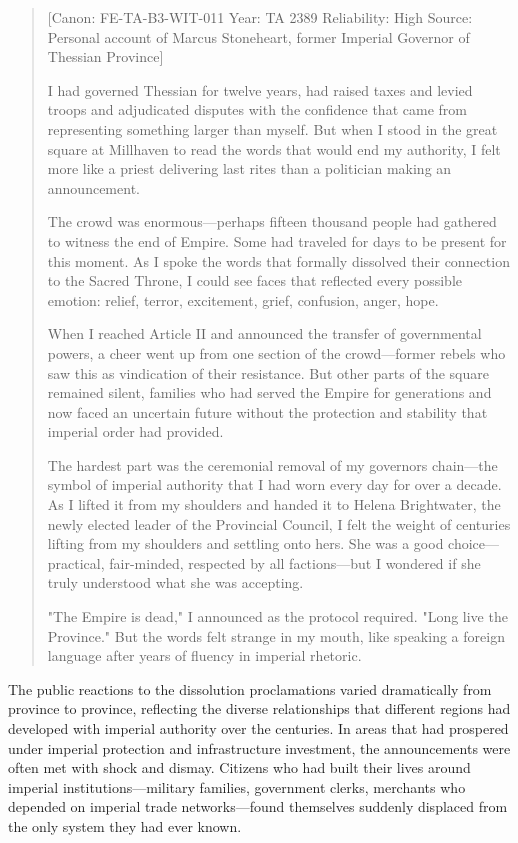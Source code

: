 \begin{quote}
{[}Canon: FE-TA-B3-WIT-011 \textbar{} Year: TA 2389 \textbar{}
Reliability: High \textbar{} Source: Personal account of Marcus
Stoneheart, former Imperial Governor of Thessian Province{]}

I had governed Thessian for twelve years, had raised taxes and levied
troops and adjudicated disputes with the confidence that came from
representing something larger than myself. But when I stood in the great
square at Millhaven to read the words that would end my authority, I
felt more like a priest delivering last rites than a politician making
an announcement.

The crowd was enormous---perhaps fifteen thousand people had gathered to
witness the end of Empire. Some had traveled for days to be present for
this moment. As I spoke the words that formally dissolved their
connection to the Sacred Throne, I could see faces that reflected every
possible emotion: relief, terror, excitement, grief, confusion, anger,
hope.

When I reached Article II and announced the transfer of governmental
powers, a cheer went up from one section of the crowd---former rebels
who saw this as vindication of their resistance. But other parts of the
square remained silent, families who had served the Empire for
generations and now faced an uncertain future without the protection and
stability that imperial order had provided.

The hardest part was the ceremonial removal of my
governor\textquotesingle s chain---the symbol of imperial authority that
I had worn every day for over a decade. As I lifted it from my shoulders
and handed it to Helena Brightwater, the newly elected leader of the
Provincial Council, I felt the weight of centuries lifting from my
shoulders and settling onto hers. She was a good choice---practical,
fair-minded, respected by all factions---but I wondered if she truly
understood what she was accepting.

"The Empire is dead," I announced as the protocol required. "Long live
the Province." But the words felt strange in my mouth, like speaking a
foreign language after years of fluency in imperial rhetoric.
\end{quote}

The public reactions to the dissolution proclamations varied
dramatically from province to province, reflecting the diverse
relationships that different regions had developed with imperial
authority over the centuries. In areas that had prospered under imperial
protection and infrastructure investment, the announcements were often
met with shock and dismay. Citizens who had built their lives around
imperial institutions---military families, government clerks, merchants
who depended on imperial trade networks---found themselves suddenly
displaced from the only system they had ever known.

